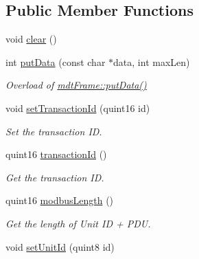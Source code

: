 \subsection*{Public Member Functions}
\begin{DoxyCompactItemize}
\item 
void \hyperlink{classmdt_frame_modbus_tcp_a622fd5104f4e91a96621e6b5e0f4f89f}{clear} ()
\item 
int \hyperlink{classmdt_frame_modbus_tcp_a0f684d77c03e5fb91598c9a10715bedb}{putData} (const char $\ast$data, int maxLen)
\begin{DoxyCompactList}\small\item\em Overload of \hyperlink{classmdt_frame_ae63af784d2fc54430ea5db4dc80b7ec8}{mdtFrame::putData()} \end{DoxyCompactList}\item 
\hypertarget{classmdt_frame_modbus_tcp_a3c5528d2e45111ec0563dfd3350177cd}{
void \hyperlink{classmdt_frame_modbus_tcp_a3c5528d2e45111ec0563dfd3350177cd}{setTransactionId} (quint16 id)}
\label{classmdt_frame_modbus_tcp_a3c5528d2e45111ec0563dfd3350177cd}

\begin{DoxyCompactList}\small\item\em Set the transaction ID. \end{DoxyCompactList}\item 
\hypertarget{classmdt_frame_modbus_tcp_a48a7e24190190da0ae9f5dbdfcd1ee48}{
quint16 \hyperlink{classmdt_frame_modbus_tcp_a48a7e24190190da0ae9f5dbdfcd1ee48}{transactionId} ()}
\label{classmdt_frame_modbus_tcp_a48a7e24190190da0ae9f5dbdfcd1ee48}

\begin{DoxyCompactList}\small\item\em Get the transaction ID. \end{DoxyCompactList}\item 
\hypertarget{classmdt_frame_modbus_tcp_a5213eb7e3670a191d2b75c83f5dd8d71}{
quint16 \hyperlink{classmdt_frame_modbus_tcp_a5213eb7e3670a191d2b75c83f5dd8d71}{modbusLength} ()}
\label{classmdt_frame_modbus_tcp_a5213eb7e3670a191d2b75c83f5dd8d71}

\begin{DoxyCompactList}\small\item\em Get the length of Unit ID + PDU. \end{DoxyCompactList}\item 
\hypertarget{classmdt_frame_modbus_tcp_ab6bb1765abd0910c6511954a17526243}{
void \hyperlink{classmdt_frame_modbus_tcp_ab6bb1765abd0910c6511954a17526243}{setUnitId} (quint8 id)}
\label{classmdt_frame_modbus_tcp_ab6bb1765abd0910c6511954a17526243}


\end{DoxyCompactItemize}
